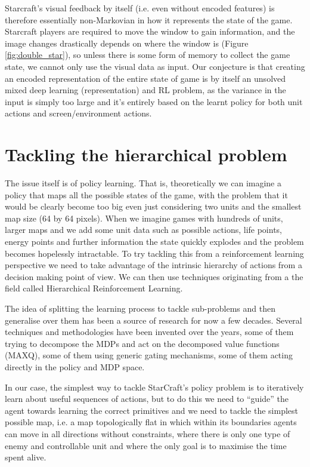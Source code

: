 \documentclass[bsc,frontabs,twoside,singlespacing,parskip,deptreport]{infthesis}     %
\begin{document}
Starcraft’s visual feedback by itself (i.e. even without encoded features) is
therefore essentially non-Markovian in how it represents the state of the game.
Starcraft players are required to move the window to gain information, and the
image changes drastically depends on where the window is (Figure
\ref{fig:double_star}), so unless there is some form of memory to collect the
game state, we cannot only use the visual data as input. Our conjecture is that
creating an encoded representation of the entire state of game is by itself an
unsolved mixed deep learning (representation) and RL problem, as the variance in
the input is simply too large and it's entirely based on the learnt policy for
both unit actions and screen/environment actions.

\section{Tackling the hierarchical problem}

The issue itself is of policy learning. That is, theoretically we can imagine a
policy that maps all the possible states of the game, with the problem that it
would be clearly become too big even just considering two units and the smallest
map size (64 by 64 pixels). When we imagine games with hundreds of units, larger
maps and we add some unit data such as possible actions, life points, energy
points and further information the state quickly explodes and the problem
becomes hopelessly intractable. To try tackling this from a reinforcement
learning perspective we need to take advantage of the intrinsic hierarchy of
actions from a decision making point of view. We can then use techniques
originating from a the field called Hierarchical Reinforcement Learning.

The idea of splitting the learning process to tackle sub-problems and then
generalise over them has been a source of research for now a few decades.
Several techniques and methodologies have been invented over the years, some of
them trying to decompose the MDPs\cite{marthi2005concurrent} and act on the
decomposed value functions (MAXQ)\cite{dietterich2000hierarchical}, some of them
using generic gating mechanisms\cite{watkins1989learning}, some of them acting
directly in the policy and MDP space\cite{stolle2002learning}.

In our case, the simplest way to tackle StarCraft's policy problem is to
iteratively learn about useful sequences of actions, but to do this we need to
``guide'' the agent towards learning the correct primitives and we need to
tackle the simplest possible map, i.e. a map topologically flat in which within
its boundaries agents can move in all directions without constraints, where
there is only one type of enemy and controllable unit and where the only goal is
to maximise the time spent alive.
\end{document}
